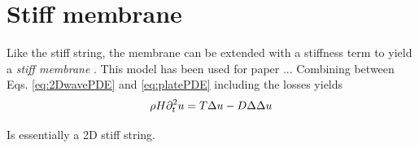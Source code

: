 \section{Stiff membrane}
Like the stiff string, the membrane can be extended with a stiffness term to yield a \textit{stiff membrane} \cite{Fletcher1998}. This model has been used for paper \citeP[F]...
Combining between Eqs. \eqref{eq:2DwavePDE} and \eqref{eq:platePDE} including the losses yields
\begin{equation}\label{eq:stiffMembrane}
    \rho H \partial_t^2 u = T\Delta u - D
    \Delta\Delta u
\end{equation}


Is essentially a 2D stiff string. 